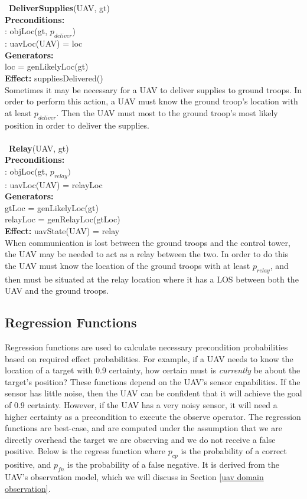 \documentclass[12pt]{article}
\begin{document}
\\\
\\\
\textbf{DeliverSupplies}(UAV, gt) \\
\textbf{Preconditions:} \\
: objLoc(gt, $p_{deliver}$) \\
\indent 1: uavLoc(UAV) = loc \\
\textbf{Generators:} \\
\indent loc = genLikelyLoc(gt) \\
\textbf{Effect:} suppliesDelivered() \\
Sometimes it may be necessary for a UAV to deliver supplies to ground troops. In order to perform this action, a UAV must know the ground troop's location with at least $p_{deliver}$. Then the UAV must most to the ground troop's most likely position in order to deliver the supplies.
\\\
\\\
\textbf{Relay}(UAV, gt) \\
\textbf{Preconditions:} \\ 
: objLoc(gt, $p_{relay})$ \\
: uavLoc(UAV) = relayLoc \\
\textbf{Generators:} \\
\indent gtLoc = genLikelyLoc(gt) \\
\indent relayLoc = genRelayLoc(gtLoc) \\
\textbf{Effect:} uavState(UAV) = relay \\
When communication is lost between the ground troops and the control tower, the UAV may be needed to act as a relay between the two. In order to do this the UAV must know the location of the ground troops with at least $p_{relay}$, and then must be situated at the relay location where it has a LOS between both the UAV and the ground troops.

\subsection{Regression Functions}

Regression functions are used to calculate necessary precondition probabilities based on required effect probabilities. For example, if a UAV needs to know the location of a target with 0.9 certainty, how certain must is \textit{currently} be about the target's position? These functions depend on the UAV's sensor capabilities. If the sensor has little noise, then the UAV can be confident that it will achieve the goal of 0.9 certainty. However, if the UAV has a very noisy sensor, it will need a higher certainty as a precondition to execute the observe operator. The regression functions are best-case, and are computed under the assumption that we are directly overhead the target we are observing and we do not receive a false positive. Below is the regress function where $p_{cp}$ is the probability of a correct positive, and $p_{fn}$ is the probability of a false negative. It is derived from the UAV's observation model, which we will discuss in Section \ref{uav domain observation}.
\end{document}
